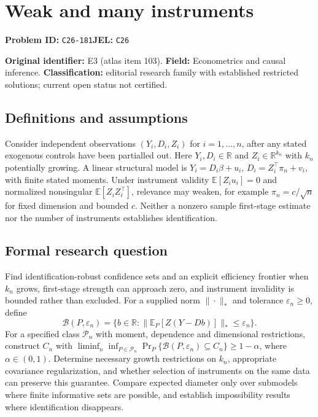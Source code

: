 \documentclass[11pt,a4paper]{article}
\begin{document}
\section*{Weak and many instruments}
\textbf{Problem ID:} \texttt{C26-181}\quad \textbf{JEL:} \texttt{C26}\par
\label{problem:OP-0103}
\label{atlas:prob:E3}

\noindent\textbf{Original identifier:} E3 (atlas item 103). \textbf{Field:} Econometrics and causal inference. \textbf{Classification:} editorial research family with established restricted solutions; current open status not certified.

\subsection*{Definitions and assumptions}

Consider independent observations $(Y_i,D_i,Z_i)$ for $i=1,\ldots,n$, after any stated exogenous controls have been partialled out. Here $Y_i,D_i\in\mathbb R$ and $Z_i\in\mathbb R^{k_n}$ with $k_n$ potentially growing. A linear structural model is $Y_i=D_i\beta+u_i$, $D_i=Z_i^\top\pi_n+v_i$, with finite stated moments. Under instrument validity $\mathbb E[Z_i u_i]=0$ and normalized nonsingular $\mathbb E[Z_iZ_i^\top]$, relevance may weaken, for example $\pi_n=c/\sqrt n$ for fixed dimension and bounded $c$. Neither a nonzero sample first-stage estimate nor the number of instruments establishes identification.

\subsection*{Formal research question}

Find identification-robust confidence sets and an explicit efficiency frontier when $k_n$ grows, first-stage strength can approach zero, and instrument invalidity is bounded rather than excluded. For a supplied norm $\|\cdot\|_*$ and tolerance $\varepsilon_n\ge0$, define
\[
\mathcal B(P,\varepsilon_n)=
\{b\in\mathbb R:\|\mathbb E_P[Z(Y-Db)]\|_*\le\varepsilon_n\}.
\]
For a specified class $\mathcal P_n$ with moment, dependence and dimensional restrictions, construct $C_n$ with $\liminf_n\inf_{P\in\mathcal P_n}\Pr_P\{\mathcal B(P,\varepsilon_n)\subseteq C_n\}\ge1-\alpha$, where $\alpha\in(0,1)$. Determine necessary growth restrictions on $k_n$, appropriate covariance regularization, and whether selection of instruments on the same data can preserve this guarantee. Compare expected diameter only over submodels where finite informative sets are possible, and establish impossibility results where identification disappears.
\end{document}

